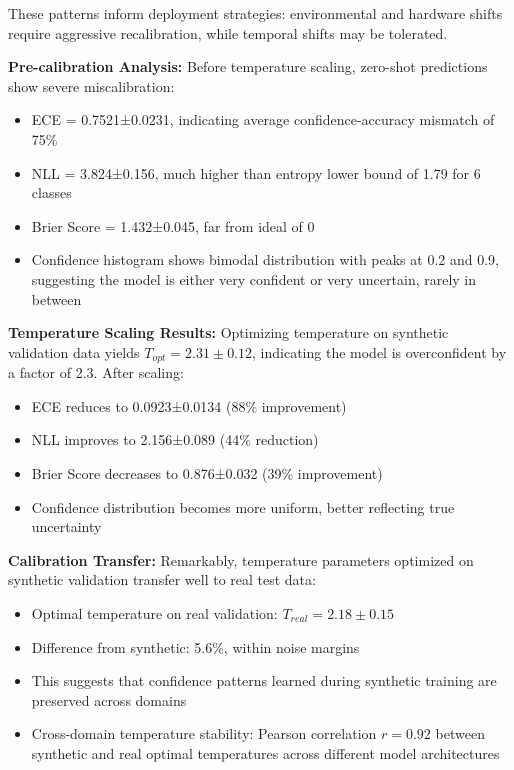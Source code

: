 \documentclass[journal]{IEEEtran}
\begin{document}
These patterns inform deployment strategies: environmental and hardware shifts require aggressive recalibration, while temporal shifts may be tolerated.

\textbf{Pre-calibration Analysis:} Before temperature scaling, zero-shot predictions show severe miscalibration:
\begin{itemize}
\item ECE = 0.7521±0.0231, indicating average confidence-accuracy mismatch of 75\%
\item NLL = 3.824±0.156, much higher than entropy lower bound of 1.79 for 6 classes
\item Brier Score = 1.432±0.045, far from ideal of 0
\item Confidence histogram shows bimodal distribution with peaks at 0.2 and 0.9, suggesting the model is either very confident or very uncertain, rarely in between
\end{itemize}

\textbf{Temperature Scaling Results:} Optimizing temperature on synthetic validation data yields $T_{opt} = 2.31±0.12$, indicating the model is overconfident by a factor of 2.3. After scaling:
\begin{itemize}
\item ECE reduces to 0.0923±0.0134 (88\% improvement)
\item NLL improves to 2.156±0.089 (44\% reduction)
\item Brier Score decreases to 0.876±0.032 (39\% improvement)
\item Confidence distribution becomes more uniform, better reflecting true uncertainty
\end{itemize}

\textbf{Calibration Transfer:} Remarkably, temperature parameters optimized on synthetic validation transfer well to real test data:
\begin{itemize}
\item Optimal temperature on real validation: $T_{real} = 2.18±0.15$
\item Difference from synthetic: 5.6\%, within noise margins
\item This suggests that confidence patterns learned during synthetic training are preserved across domains
\item Cross-domain temperature stability: Pearson correlation $r = 0.92$ between synthetic and real optimal temperatures across different model architectures
\end{itemize}
\end{document}
